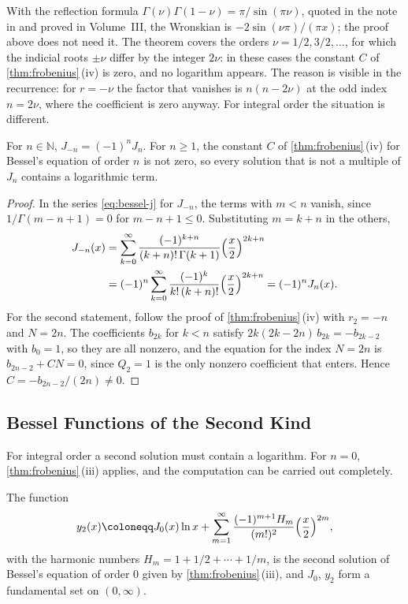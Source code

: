 With the reflection formula $\Gamma(\nu)\Gamma(1-\nu)=\pi/\sin(\pi\nu)$, quoted in the note in  and proved in Volume~III, the Wronskian is $-2\sin(\nu\pi)/(\pi x)$; the proof above does not need it. The theorem covers the orders $\nu=1/2,3/2,\ldots$, for which the indicial roots $\pm\nu$ differ by the integer $2\nu$: in these cases the constant $C$ of \cref{thm:frobenius}\,(iv) is zero, and no logarithm appears. The reason is visible in the recurrence: for $r=-\nu$ the factor that vanishes is $n(n-2\nu)$ at the odd index $n=2\nu$, where the coefficient is zero anyway. For integral order the situation is different.

\begin{proposition}
\label{prop:bessel-negative-integer}
For $n\in\mathbb N$, $J_{-n}=(-1)^nJ_n$. For $n\ge1$, the constant $C$ of \cref{thm:frobenius}\,(iv) for Bessel's equation of order $n$ is not zero, so every solution that is not a multiple of $J_n$ contains a logarithmic term.
\end{proposition}

\begin{proof}
In the series \eqref{eq:bessel-j} for $J_{-n}$, the terms with $m<n$ vanish, since $1/\Gamma(m-n+1)=0$ for $m-n+1\le0$. Substituting $m=k+n$ in the others,
\begin{align*}
J_{-n}(x)&=\sum_{k=0}^\infty\frac{(-1)^{k+n}}{(k+n)!\,\Gamma(k+1)}\Bigl(\frac x2\Bigr)^{2k+n}\\
&=(-1)^n\sum_{k=0}^\infty\frac{(-1)^k}{k!\,(k+n)!}\Bigl(\frac x2\Bigr)^{2k+n}=(-1)^nJ_n(x).
\end{align*}
For the second statement, follow the proof of \cref{thm:frobenius}\,(iv) with $r_2=-n$ and $N=2n$. The coefficients $b_{2k}$ for $k<n$ satisfy $2k(2k-2n)\,b_{2k}=-b_{2k-2}$ with $b_0=1$, so they are all nonzero, and the equation for the index $N=2n$ is $b_{2n-2}+CN=0$, since $Q_2=1$ is the only nonzero coefficient that enters. Hence $C=-b_{2n-2}/(2n)\ne0$.
\end{proof}

\subsection{Bessel Functions of the Second Kind}

For integral order a second solution must contain a logarithm. For $n=0$, \cref{thm:frobenius}\,(iii) applies, and the computation can be carried out completely.

\begin{proposition}
\label{prop:bessel-y0}
The function
\[
y_2(x)\coloneqq J_0(x)\ln x+\sum_{m=1}^\infty\frac{(-1)^{m+1}H_m}{(m!)^2}\Bigl(\frac x2\Bigr)^{2m},
\]
with the harmonic numbers $H_m=1+1/2+\cdots+1/m$, is the second solution of Bessel's equation of order $0$ given by \cref{thm:frobenius}\,(iii), and $J_0$, $y_2$ form a fundamental set on $(0,\infty)$.
\end{proposition}

